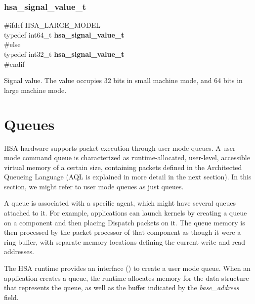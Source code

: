 \documentclass[final]{book}
\newcommand{\reffld}[1]{\textit{#1}}
\newenvironment{mylongtable}{\rowcolors{0}{lightgray}{lightgray}\longtable} {
\endlongtable}
\begin{document}
\subsubsection{hsa_\-signal_\-value_\-t}
\vspace{-3.5mm}\begin{mylongtable}{@{}p{\textwidth}}
\hypertarget{group__signals_1ga67ca2818879c9990e1b5f1b14ce7ed27}{}
\#ifdef HSA_LARGE_MODEL\\
\hspace{1.7em}typedef int64_\-t  \textbf{hsa_\-signal_\-value_\-t}\\
\#else \\
\hspace{1.7em}typedef int32_\-t  \textbf{hsa_\-signal_\-value_\-t}\\
\#endif
\end{mylongtable}
Signal value. The value occupies 32 bits in small machine mode, and 64 bits in large machine mode.
\\



\section{Queues} \label{sec:queues}

HSA hardware supports packet execution through user mode queues. A user mode
command queue is characterized as runtime-allocated, user-level,
accessible virtual memory of a certain size, containing packets defined in the
Architected Queueing Language (AQL is explained in more detail in the next
section). In this section, we might refer to user mode queues as just queues.

A queue is associated with a specific agent, which might have several queues
attached to it. For example, applications can launch kernels by creating a queue
on a component and then placing Dispatch packets on it. The queue memory is then
processed by the packet processor of that component as though it were a ring
buffer, with separate memory locations defining the current write and read
addresses.

The HSA runtime provides an interface () to create a
user mode queue. When an application creates a queue, the runtime allocates
memory for the data structure that represents the queue, as well as the buffer
indicated by the \reffld{base_address} field.
\end{document}
